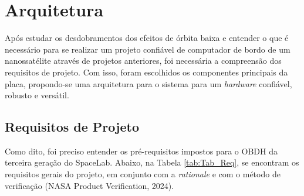 \chapter{Arquitetura}

Após estudar os desdobramentos dos efeitos de órbita baixa e entender o que é necessário para se realizar um projeto confiável de computador de bordo de um nanossatélite através de projetos anteriores, foi necessária a compreensão dos requisitos de projeto. Com isso, foram escolhidos os componentes principais da placa, propondo-se uma arquitetura para o sistema para um \textit{hardware} confiável, robusto e versátil.  

\section{Requisitos de Projeto}

Como dito, foi preciso entender os pré-requisitos impostos para o OBDH da terceira geração do SpaceLab. Abaixo, na Tabela \ref{tab:Tab_Req}, se encontram os requisitos gerais do projeto, em conjunto com a \textit{rationale} e com o método de verificação (NASA Product Verification, 2024).

